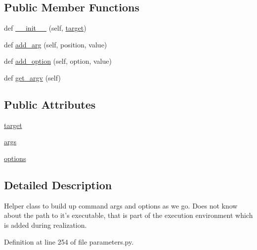 \subsection*{Public Member Functions}
\begin{DoxyCompactItemize}
\item 
def \hyperlink{classcodar_1_1cheetah_1_1parameters_1_1_code_command_a706c2fb3961bd3a8eb91d1034020893c}{\+\_\+\+\_\+init\+\_\+\+\_\+} (self, \hyperlink{classcodar_1_1cheetah_1_1parameters_1_1_code_command_a52652e8b3bc2c4bcf55f7edd13f8258c}{target})
\item 
def \hyperlink{classcodar_1_1cheetah_1_1parameters_1_1_code_command_a869d18602cb7e516157c871a6a80527e}{add\+\_\+arg} (self, position, value)
\item 
def \hyperlink{classcodar_1_1cheetah_1_1parameters_1_1_code_command_ab2d06207053333ebd442800d991a5056}{add\+\_\+option} (self, option, value)
\item 
def \hyperlink{classcodar_1_1cheetah_1_1parameters_1_1_code_command_a94799c614d5777f929817d9a855a0f88}{get\+\_\+argv} (self)
\end{DoxyCompactItemize}
\subsection*{Public Attributes}
\begin{DoxyCompactItemize}
\item 
\hyperlink{classcodar_1_1cheetah_1_1parameters_1_1_code_command_a52652e8b3bc2c4bcf55f7edd13f8258c}{target}
\item 
\hyperlink{classcodar_1_1cheetah_1_1parameters_1_1_code_command_a5130989e66f83d0d6750f32a84edf44e}{args}
\item 
\hyperlink{classcodar_1_1cheetah_1_1parameters_1_1_code_command_a7b7c38e78d429b1395daf3e6b199aafe}{options}
\end{DoxyCompactItemize}


\subsection{Detailed Description}
\begin{DoxyVerb}Helper class to build up command args and options as we go. Does not
know about the path to it's executable, that is part of the execution
environment which is added during realization.
\end{DoxyVerb}
 

Definition at line 254 of file parameters.\+py.



